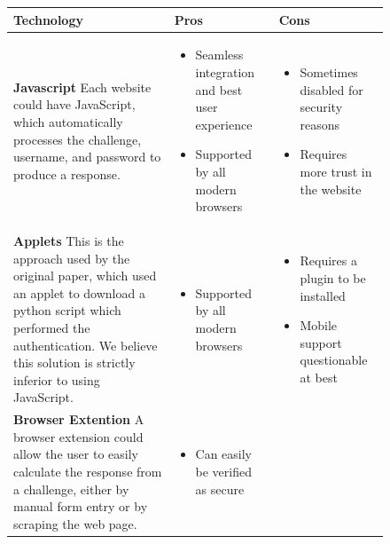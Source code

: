 \documentclass[11pt]{article}
\begin{document}
\begin{figure}[h]
\small
\centering
    \begin{tabular}{|  p{6cm} | p{5cm} | p{5cm} |}
    \hline
    Technology & Pros & Cons \\ \hline
    \vspace{.4cm}
    \textbf{Javascript}
    Each website could have JavaScript, which automatically processes the challenge, username, and password to produce a response. & 

    \begin{itemize}[leftmargin=*]
    \item  Seamless integration and best user experience

    \item  Supported by all modern browsers
    \end{itemize}
    &
    \begin{itemize}[leftmargin=*]
    \item Sometimes disabled for security reasons

    \item Requires more trust in the website
    \end{itemize}
    \\ \hline
    \vspace{.4cm}
    \textbf{Applets}
    This is the approach used by the original paper, which used an applet to download a python script which performed the authentication. We believe this solution is strictly inferior to using JavaScript.
    &
    \begin{itemize}[leftmargin=*]
    \item  Supported by all modern browsers
    \end{itemize}
    &
    \begin{itemize}[leftmargin=*]
    \item Requires a plugin to be installed

    \item Mobile support questionable at best
    \end{itemize}

    \\ \hline
    \vspace{.4cm}
    \textbf{Browser Extention}
    A browser extension could allow the user to easily calculate the response from a challenge, either by manual form entry or by scraping the web page.

    &
    \begin{itemize}[leftmargin=*]
    \item Can easily be verified as secure


\end{itemize}
\end{tabular}
\end{figure}
\end{document}
